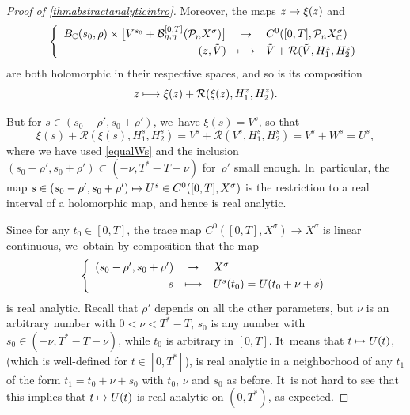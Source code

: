 \documentclass[11pt]{article}
\providecommand{\dpl}{\displaystyle}
\newcommand\mto{\mathchoice{\longmapsto}{\mapsto}{\mapsto}{\mapsto}}
\theoremstyle{definition}
\let\mc\mathcal
\newcommand{\B}{\mc{B}}
\renewcommand{\P}{\mathcal{P}}
\begin{document}
\begin{proof}[Proof of \cref{thmabstractanalyticintro}]
Moreover, the maps $z\mto \xi(z)$ and
\begin{align*}
\left\{\begin{array}{rcl}
B_{\mathbb{C}}(s_0, \rho)\times \bigl[V^{s_0}+ \B_{\eta,\eta}^{[0,T]}(\P_n X^{\sigma})\bigr]&\dpl\to& C^0([0, T], \P_n X_{\mathbb{C}}^\sigma)\\[3pt]
(z,\Tilde{V})&\dpl\mto&\Tilde{V}+ \mathcal{R}(\Tilde{V},H_{1}^z,H_{2}^z)
\end{array}\right.
\end{align*}
are both holomorphic in their respective spaces, and so is its composition\vspace*{-3pt}
\[
z\mto \xi(z)+\mathcal{R}(\xi(z),H_{1}^z,H_{2}^z).
\]

But for $s\in (s_0-\rho',s_0+\rho')$, we~have $\xi(s)=V^s$, so that
\[
\xi(s)+\mathcal{R}(\xi(s),H_{1}^s,H_{2}^s)=V^s+\mathcal{R}(V^s,H_{1}^s,H_{2}^s)=V^s+W^s=U^s,
\]
where we have used \eqref{equalWs} and the inclusion $(s_0-\rho',s_0+\rho')\subset (-\nu,T^*-T-\nu)$ for~$\rho'$ small enough. In~particular, the map $s\in (s_0-\rho',s_0+\rho')\mto U^s\in C^0([0, T], X^\sigma)$ is the restriction to a real interval of a holomorphic map, and hence is real analytic.

Since for any $t_0\in [0,T]$, the trace map $C^0([0, T], X^\sigma)\to X^\sigma$ is linear continuous, we~obtain by composition that the map\vspace*{-3pt}
\begin{align*}
\left\{\begin{array}{rcl}
(s_0-\rho',s_0+\rho')&\dpl\to& X^\sigma\\[3pt]
s&\dpl\mto&U^s(t_0)=U(t_0+\nu+s)
\end{array}\right.
\end{align*}
is real analytic. Recall that $\rho'$ depends on all the other parameters, but $\nu$ is an arbitrary number with $0<\nu<T^*-T$, $s_0$ is any number with $s_0\in (-\nu,T^*-T-\nu)$, while $t_0$ is arbitrary in $[0,T]$. It~means that $t\mto U(t)$, (which is well-defined for $t\in [0,T^*]$), is real analytic in a neighborhood of any $t_1$ of the form $t_1=t_0+\nu+s_0$ with $t_0$, $\nu$ and $s_0$ as before. It~is not hard to see that this implies that $t\mto U(t)$ is real analytic on $(0,T^*)$, as expected.
\end{proof}


\setcounter{equation}{13}

\appendix
\setcounter{theorem}{0}
\renewcommand{\thetheorem}{A.\arabic{theorem}}
\renewcommand{\theequation}{A.\arabic{equation}}
\renewcommand{\thesubsection}{A.\arabic{subsection}}
\end{document}
